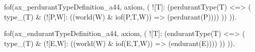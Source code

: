 

  





fof(ax_perdurantTypeDefinition_a44, axiom, (
  ![T]: (perdurantType(T) <=> (
    type_(T) & (![P,W]: ((world(W) & iof(P,T,W)) => (perdurant(P))))
  ))
)).

fof(ax_endurantTypeDefinition_a44, axiom, (
  ![T]: (endurantType(T) <=> (
    type_(T) & (![E,W]: ((world(W) & iof(E,T,W)) => (endurant(E))))
  ))
)).

